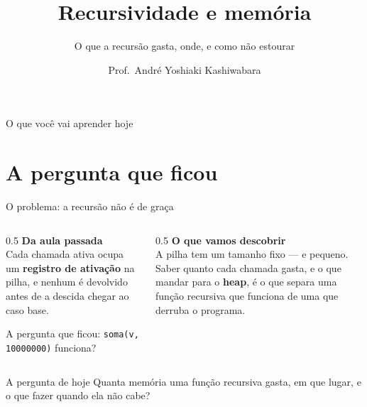 \documentclass[aspectratio=169]{beamer}
\title{Recursividade e memória}
\subtitle{O que a recursão gasta, onde, e como não estourar}
\author{Prof.\ André Yoshiaki Kashiwabara}
\institute{DCOMP -- Universidade Federal de Sergipe\\
\texttt{andreyoshiaki@dcomp.ufs.br}}
\date{}
\begin{document}
\begin{frame}[plain]
  \titlepage
\end{frame}

\begin{frame}{O que você vai aprender hoje}
  \begin{center}
  \end{center}
\end{frame}

\section{A pergunta que ficou}

\begin{frame}{O problema: a recursão não é de graça}
  \begin{columns}[T]
    \begin{column}{0.5\textwidth}
      \textbf{Da aula passada}\\[0.3em]
      \small
      Cada chamada ativa ocupa um \textbf{registro de ativação} na pilha, e
      nenhum é devolvido antes de a descida chegar ao caso base.

      \medskip
      A pergunta que ficou: \textcolor{UFSRed}{\texttt{soma(v, 10000000)}
      funciona?}
    \end{column}
    \begin{column}{0.5\textwidth}
      \textbf{O que vamos descobrir}\\[0.3em]
      \small
      A pilha tem um tamanho fixo --- e pequeno. Saber quanto cada chamada
      gasta, e o que mandar para o \textbf{heap}, é o que separa uma função
      recursiva que funciona de uma que derruba o programa.
    \end{column}
  \end{columns}
  \begin{block}{A pergunta de hoje}
    Quanta memória uma função recursiva gasta, em que lugar, e o que fazer
    quando ela não cabe?
  \end{block}
\end{frame}
\end{document}
